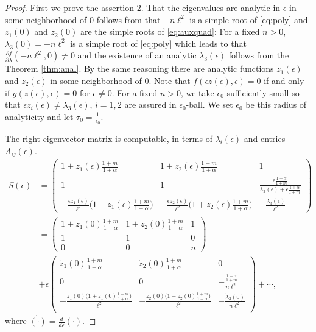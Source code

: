 \documentclass[a4paper,11pt]{article}
\def\l{{\ell}}
\theoremstyle{remark}
\begin{document}
{\begin{proof}
 First we prove the assertion 2. That the eigenvalues are analytic in $\epsilon$ in some neighborhood of $0$ follows from that $-n\l^2$ is a simple root of \eqref{eq:poly} and $z_1(0)$ and $z_2(0)$ are the simple roots of \eqref{eq:auxquad}: For a fixed $n>0$, $\lambda_3(0)= -n\l^2$ is a simple root of \eqref{eq:poly} which leads to that $\frac{\partial f}{\partial \lambda}(-n\l^2,0)\ne 0$ and the existence of an analytic $\lambda_3(\epsilon)$ follows from the Theorem \ref{thm:anal}. By the same reasoning there are analytic functions $z_1(\epsilon)$ and $z_2(\epsilon)$ in some neighborhood of $0$. Note that $f(\epsilon z(\epsilon),\epsilon)=0$ if and only if $g(z(\epsilon),\epsilon)=0$ for $\epsilon\ne0$. For a fixed $n>0$, we take $\epsilon_0$ sufficiently small so that $\epsilon z_i(\epsilon)\ne \lambda_3(\epsilon)$, $i=1,2$ are assured in $\epsilon_0$-ball. We set $\epsilon_0$ be this radius of analyticity and let $\tau_0 = \frac{1}{\epsilon_0}$.

 The right eigenvector matrix is computable, in terms of $\lambda_i(\epsilon)$ and entries $A_{ij}(\epsilon)$.
 \begin{equation} \label{eq:S}
  \begin{aligned}
 S(\epsilon) &=   \begin{pmatrix}
     1 + z_1(\epsilon)\frac{1+m}{1+\alpha} & 1 + z_2(\epsilon)\frac{1+m}{1+\alpha} & 1\\
     1 & 1 & \frac{\epsilon \tfrac{1+\alpha}{1+m}}{\lambda_3(\epsilon) + \epsilon\tfrac{1+\alpha}{1+m}}\\
     -\frac{\epsilon z_1(\epsilon)}{\l^2}\Big(1 + z_1(\epsilon)\frac{1+m}{1+\alpha}\Big) & -\frac{\epsilon z_2(\epsilon)}{\l^2}\Big(1 + z_2(\epsilon)\frac{1+m}{1+\alpha}\Big) & -\frac{\lambda_3(\epsilon)}{\l^2}
    \end{pmatrix}\\
    &=\begin{pmatrix}
     1 + z_1(0)\frac{1+m}{1+\alpha} & 1 + z_2(0)\frac{1+m}{1+\alpha} & 1 \\
     1 & 1 & 0\\
     0 & 0 & n
    \end{pmatrix}\\&+ \epsilon
    \begin{pmatrix}
     \dot z_1(0)\frac{1+m}{1+\alpha} & \dot z_2(0)\frac{1+m}{1+\alpha} & 0 \nonumber\\
     0 & 0 & -\frac{\frac{1+\alpha}{1+m}}{n\l^2}\\
     -\frac{z_1(0)\big(1+z_1(0)\frac{1+m}{1+\alpha}\big)}{\l^2} & -\frac{z_2(0)\big(1+z_2(0)\frac{1+m}{1+\alpha}\big)}{\l^2} & -\frac{\dot\lambda_3(0)}{n\l^2} \nonumber\\
    \end{pmatrix} + \cdots,
  \end{aligned}
 \end{equation}
 where $\dot{(\cdot)}=\frac{d}{d\epsilon}(\cdot)$.


\end{proof}}
\end{document}

